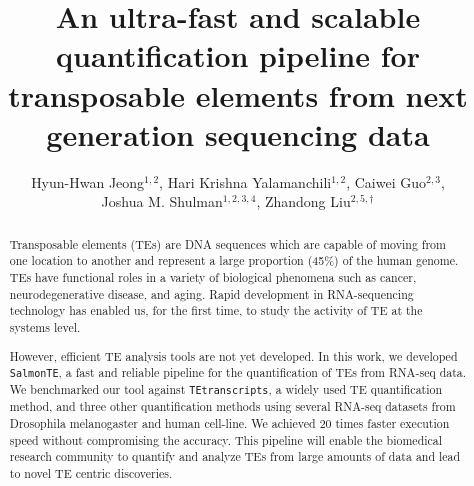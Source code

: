 \documentclass[wsdraft]{ws-procs11x85}
\newcommand{\TEtranscripts}{\texttt{TEtranscripts}}
\newcommand{\SalmonTE}{\texttt{SalmonTE}}
\begin{document}
\title{An ultra-fast and scalable quantification pipeline for transposable elements from next generation sequencing data}

\author{Hyun-Hwan Jeong$^{1,2}$, Hari Krishna Yalamanchili$^{1,2}$, Caiwei Guo$^{2,3}$, \\
Joshua M. Shulman$^{1,2,3,4}$, Zhandong Liu$^{2,5,\dag}$}

\address{$^{1}$Department of Molecular and Human Genetics, Baylor College of Medicine,\\
$^{2}$Jan and Dan Duncan Neurological Research Institute, Texas Children’s Hospital,\\
$^{3}$Department of Neuroscience, Baylor College of Medicine,\\
$^{4}$Department of Neurology, Baylor College of Medicine,\\
$^{5}$Department of Pediatrics, Baylor College of Medicine,\\
Houston, Texas 77030, USA\\
$^{\dag}$E-mail: zhandonl@bcm.edu}

\begin{abstract}

Transposable elements (TEs) are DNA sequences which are capable of moving from one location to another and represent a large proportion (45\%) of the human genome. 
TEs have functional roles in a variety of biological phenomena such as cancer,
neurodegenerative disease, and aging.
Rapid development in RNA-sequencing technology has enabled us, for the first time, to study the activity of TE at the systems level.  


However, efficient TE analysis tools are not yet developed.
In this work, we developed \SalmonTE, a fast and reliable pipeline for the quantification of TEs from 
RNA-seq data.
We benchmarked our tool against \TEtranscripts, a widely used TE quantification method,  and three other quantification methods using several RNA-seq datasets from
Drosophila melanogaster and human cell-line.
We achieved 20 times faster execution speed without compromising the accuracy.
This pipeline will enable the biomedical research community to quantify and analyze TEs from large amounts of data and lead to novel TE centric discoveries.


\end{abstract}


\end{document}
